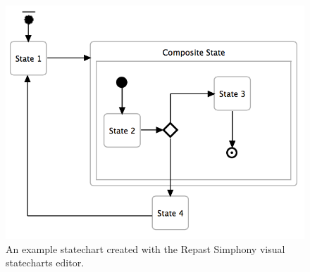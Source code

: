\documentclass[11pt]{amsart}
\begin{document}
\begin{figure}
\begin{center}
\vspace{.2in}
\centerline {
\includegraphics[width=5in]{StatechartsImages/StatechartExample.png}
}
\caption{An example statechart created with the Repast Simphony visual statecharts editor.}
\label{fig:statechartExample}
\end{center}
\end{figure}
\end{document}
